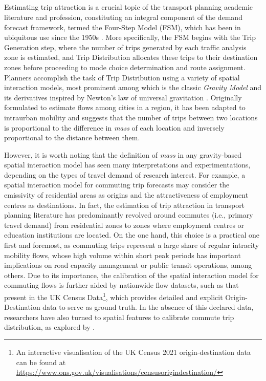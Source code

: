 \pagebreak
\subsection*{}

Estimating trip attraction is a crucial topic of the transport planning academic literature and profession, constituting an integral component of the demand forecast framework, termed the Four-Step Model (FSM), which has been in ubiquitous use since the 1950s \citep{TravelForecastingResource}. More specifically, the FSM begins with the Trip Generation step, where the number of trips generated by each traffic analysis zone is estimated, and Trip Distribution allocates these trips to their destination zones before proceeding to mode choice determination and route assignment. Planners accomplish the task of Trip Distribution using a variety of spatial interaction models, most prominent among which is the classic \textit{Gravity Model} and its derivatives inspired by Newton's law of universal gravitation \citep{erlanderGravityModelTransportation1990}. Originally formulated to estimate flows among cities in a region, it has been adapted to intraurban mobility and suggests that the number of trips between two locations is proportional to the difference in \textit{mass} of each location and inversely proportional to the distance between them. 

However, it is worth noting that the definition of \textit{mass} in any gravity-based spatial interaction model has seen many interpretations and experimentations, depending on the types of travel demand of research interest. For example, a spatial interaction model for commuting trip forecasts may consider the emissivity of residential areas as origins and the attractiveness of employment centres as destinations. In fact, the estimation of trip attraction in transport planning literature has predominantly revolved around commutes (i.e., primary travel demand) from residential zones to zones where employment centres or education institutions are located. On the one hand, this choice is a practical one first and foremost, as commuting trips represent a large share of regular intracity mobility flows, whose high volume within short peak periods has important implications on road capacity management or public transit operations, among others. Due to its importance, the calibration of the spatial interaction model for commuting flows is further aided by nationwide flow datasets, such as that present in the UK Census Data\footnote{An interactive visualisation of the UK Census 2021 origin-destination data can be found at \url{https://www.ons.gov.uk/visualisations/censusorigindestination/}}, which provides detailed and explicit Origin-Destination data to serve as ground truth. In the absence of this declared data, researchers have also turned to spatial features to calibrate commute trip distribution, as explored by \cite{yangLimitsPredictabilityCommuting2014}.


